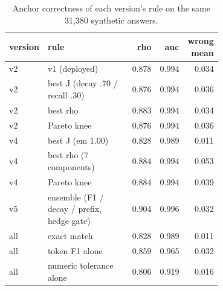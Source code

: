 \begin{table}[htbp]
\centering\scriptsize
\caption{Anchor correctness of each version's rule on the same 31,380 synthetic answers.}
\label{tab:cmp_anchors}
\setlength{\tabcolsep}{3pt}
\begin{tabular}{lp{0.700\linewidth}rrr}
\toprule
version & rule & rho & auc & wrong mean \\
\midrule
v2 & v1 (deployed) & 0.878 & 0.994 & 0.034 \\
v2 & best J (decay .70 / recall .30) & 0.876 & 0.994 & 0.036 \\
v2 & best rho & 0.883 & 0.994 & 0.034 \\
v2 & Pareto knee & 0.876 & 0.994 & 0.036 \\
v4 & best J (em 1.00) & 0.828 & 0.989 & 0.011 \\
v4 & best rho (7 components) & 0.884 & 0.994 & 0.053 \\
v4 & Pareto knee & 0.884 & 0.994 & 0.039 \\
v5 & ensemble (F1 / decay / prefix, hedge gate) & 0.904 & 0.996 & 0.032 \\
all & exact match & 0.828 & 0.989 & 0.011 \\
all & token F1 alone & 0.859 & 0.965 & 0.032 \\
all & numeric tolerance alone & 0.806 & 0.919 & 0.016 \\
\bottomrule
\end{tabular}
\end{table}

